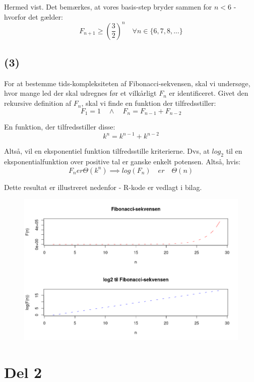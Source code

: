\documentclass[a4paper,10pt]{article}
\begin{document}
Hermed vist. Det bemærkes, at vores basis-step bryder sammen for $n < 6$ - hvorfor det gælder:
$$
F_{n+1} \geq (\frac{3}{2})^{n} \quad \forall n \in \{6, 7, 8,...\}
$$

\subsection*{(3)}

For at bestemme tids-kompleksiteten af Fibonacci-sekvensen, skal vi undersøge, hvor mange led der skal udregnes før et vilkårligt $F_{n}$ er identificeret. Givet den rekursive definition af $F_{n}$, skal vi finde en funktion der tilfredsstiller:
$$
F_{1} = 1 \quad \wedge \quad
F_{n} = F_{n-1} + F_{n-2}
$$

En funktion, der tilfredsstiller disse: 
$$
k^{n} = k^{n-1}+k^{n-2}
$$

Altså, vil en eksponentiel funktion tilfredsstille kriterierne. Dvs, at $log_{2}$ til en eksponentialfunktion over positive tal er ganske enkelt potensen. Altså, hvis:
$$
F_{n} er \Theta(k^{n}) \implies log(F_{n}) \quad er \quad \Theta(n)
$$

Dette resultat er illustreret nedenfor - R-kode er vedlagt i bilag. 

\begin{figure}[H]
\centering
\includegraphics[scale = 0.5]{fibSeq.png}
\end{figure}

\section*{Del 2}
\end{document}
